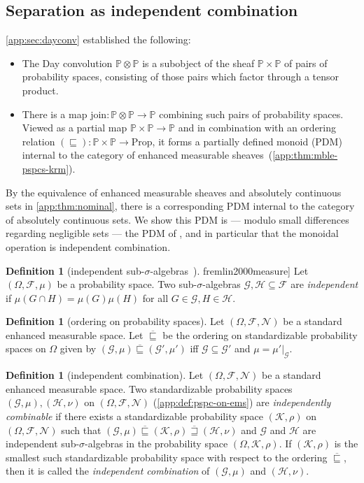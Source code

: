 \documentclass[
  sigconf,
  screen, ]{acmart}
\theoremstyle{definition}
\newtheorem{definition}[theorem]{Definition}
\newcommand\calF{\mathcal F}
\newcommand\calG{\mathcal G}
\newcommand\calH{\mathcal H}
\newcommand\calK{\mathcal K}
\newcommand\calN{\mathcal N}
\newcommand\fremlinf[3]{\cite[\href{https://www1.essex.ac.uk/maths/people/fremlin/chap#2.pdf\#page=#3}{#1}]{fremlin2000measure}}
\newcommand\nref[2]{\hyperref[#1]{#2}} \newcommand\checkhigh{{\huge{\color{red}\textbf{TODO: check}}}}
\newcommand\shotimes{\mathop{\otimes}}
\newcommand\texagoodname{absolutely continuous set}
\newcommand\agoodname{\texagoodname}
\newcommand\sheafcatadj{enhanced measurable}
\newcommand\texgoodsheaves{\sheafcatadj{} sheaves}
\newcommand\goodsheaves{\texgoodsheaves}
\newcommand\Prop{{\nref{prop:ext-ren-inv-prop}{\mathrm{Prop}}}}
\newcommand\pcmjoin{{\nref{app:def:pspcs-tensor-join}{\mathrm{join}}}}
\newcommand\texpspcs{\mathbb P}
\newcommand\pspcs{{\nref{def:mble-pspcs}{\texpspcs}}}
\newcommand\gkrmorder{\mathbin{\nref{app:def:pspc-ord}{\overline{\sqsubseteq}}}}
\newcommand\gkrmorderop{\mathbin{\nref{app:def:pspc-ord}{\overline{\sqsupseteq}}}}
\newcommand\krmorder{\mathrel{\nref{app:def:mble-pspcs-ordering}{\sqsubseteq}}}
\begin{document}
\subsection{Separation as independent combination}

\cref{app:sec:dayconv} established the following: \begin{itemize}
  \item The Day convolution $\pspcs\shotimes\pspcs$
    is a subobject of the sheaf $\pspcs\times\pspcs$
    of pairs of probability spaces, consisting of those
    pairs which factor through a tensor product.
  \item There is a map $\pcmjoin : \pspcs\shotimes\pspcs\to\pspcs$
    combining such pairs of probability spaces.
    Viewed as a partial map $\pspcs\times\pspcs\to\pspcs$
    and in combination with an ordering relation
    $(\krmorder) : \pspcs\times\pspcs\to\Prop$,
    it forms a partially defined monoid (PDM) internal to the category
    of \goodsheaves{}~(\cref{app:thm:mble-pspcs-krm}).
\end{itemize}
By the equivalence of \goodsheaves{}
and \agoodname{s} in \cref{app:thm:nominal},
there is a corresponding PDM
internal to the category of \agoodname{s}.
We show this PDM is --- modulo small differences regarding
negligible sets --- the PDM of \citet{li2023lilac},
and in particular that the
monoidal operation is independent combination.

\begin{definition}[independent sub-$\sigma$-algebras~\fremlinf{272A(b)}{27}{10}]
  Let $(\Omega,\calF,\mu)$
  be a probability space.
  Two sub-$\sigma$-algebras $\calG,\calH\subseteq\calF$
  are \emph{independent}
  if $\mu(G\cap H) = \mu(G)\mu(H)$ for all $G\in\calG,H\in\calH$.
\end{definition}

\begin{definition}[ordering on probability spaces] \label{app:def:pspc-ord}
  Let $(\Omega,\calF,\calN)$ be a standard enhanced measurable space.
  Let $\gkrmorder$ be the ordering on standardizable probability spaces on $\Omega$
  given by $(\calG,\mu)\gkrmorder (\calG',\mu')$ iff $\calG\subseteq\calG'$ and $\mu = \mu'|_\calG$.
\end{definition}

\begin{definition}[independent combination] \label{app:def:indepcomb}
  Let $(\Omega,\calF,\calN)$
  be a standard enhanced measurable space.
  Two standardizable probability spaces $(\calG,\mu),(\calH,\nu)$
  on $(\Omega,\calF,\calN)$ (\cref{app:def:pspc-on-ems})
  are \emph{independently combinable}
  if there exists a standardizable probability space $(\calK,\rho)$
  on $(\Omega,\calF,\calN)$
  such that $(\calG,\mu)\gkrmorder(\calK,\rho)\gkrmorderop(\calH,\nu)$
    and $\calG$ and $\calH$ are independent sub-$\sigma$-algebras
    in the probability space $(\Omega,\calK,\rho)$.
  If $(\calK,\rho)$ is the smallest such standardizable probability space
  with respect to the ordering $\gkrmorder$,
  then it is called the \emph{independent combination}
  of $(\calG,\mu)$ and $(\calH,\nu)$.
\end{definition}
\end{document}
